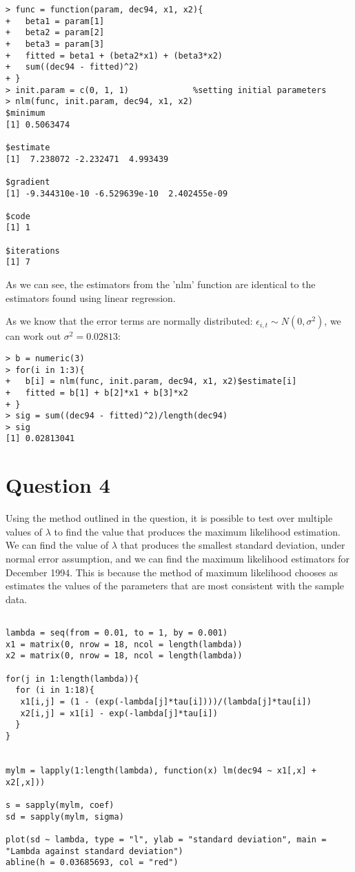 \documentclass[11pt, a4paper]{article}
\begin{document}
\begin{verbatim}
> func = function(param, dec94, x1, x2){
+   beta1 = param[1]
+   beta2 = param[2]
+   beta3 = param[3]
+   fitted = beta1 + (beta2*x1) + (beta3*x2)
+   sum((dec94 - fitted)^2)
+ }
> init.param = c(0, 1, 1)             %setting initial parameters
> nlm(func, init.param, dec94, x1, x2)
$minimum
[1] 0.5063474

$estimate
[1]  7.238072 -2.232471  4.993439

$gradient
[1] -9.344310e-10 -6.529639e-10  2.402455e-09

$code
[1] 1

$iterations
[1] 7

\end{verbatim}

As we can see, the estimators from the 'nlm' function are identical to the estimators found using linear regression.

As we know that the error terms are normally distributed: $\epsilon_{i,t} \sim N(0, \sigma^{2})$, we can work out $\sigma^{2} = 0.02813$:
\begin{verbatim}
> b = numeric(3)
> for(i in 1:3){
+   b[i] = nlm(func, init.param, dec94, x1, x2)$estimate[i]
+   fitted = b[1] + b[2]*x1 + b[3]*x2
+ }
> sig = sum((dec94 - fitted)^2)/length(dec94)
> sig
[1] 0.02813041
\end{verbatim}



\section{Question 4}

Using the method outlined in the question, it is possible to test over multiple values of $\lambda$ to find the value that produces the maximum likelihood estimation. We can find the value of $\lambda$ that produces the smallest standard deviation, under normal error assumption, and we can find the maximum likelihood estimators for December 1994. This is because the method of maximum likelihood chooses as estimates the values of the parameters that are most consistent with the sample data. 

\begin{verbatim}

lambda = seq(from = 0.01, to = 1, by = 0.001)
x1 = matrix(0, nrow = 18, ncol = length(lambda))
x2 = matrix(0, nrow = 18, ncol = length(lambda))

for(j in 1:length(lambda)){
  for (i in 1:18){
   x1[i,j] = (1 - (exp(-lambda[j]*tau[i])))/(lambda[j]*tau[i])
   x2[i,j] = x1[i] - exp(-lambda[j]*tau[i])
  }
}  


mylm = lapply(1:length(lambda), function(x) lm(dec94 ~ x1[,x] + x2[,x]))

s = sapply(mylm, coef)
sd = sapply(mylm, sigma)

plot(sd ~ lambda, type = "l", ylab = "standard deviation", main = "Lambda against standard deviation")
abline(h = 0.03685693, col = "red")

\end{verbatim}
\end{document}
